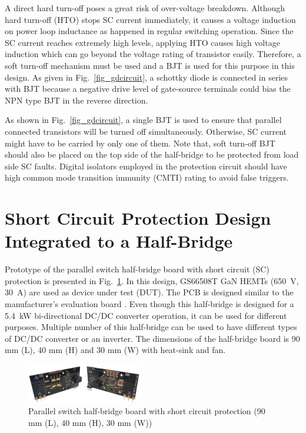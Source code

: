 \documentclass[journal]{IEEEtran}
\begin{document}
A direct hard turn-off poses a great risk of over-voltage breakdown. Although hard turn-off (HTO) stops SC current immediately, it causes a voltage induction on power loop inductance as happened in regular switching operation. Since the SC current reaches extremely high levels, applying HTO causes high voltage induction which can go beyond the voltage rating of transistor easily. Therefore, a soft turn-off mechanism must be used and a BJT is used for this purpose in this design. As given in Fig.~\ref{fig_gdcircuit}, a schottky diode is connected in series with BJT because a negative drive level of gate-source terminals could bias the NPN type BJT in the reverse direction.

As shown in Fig.~\ref{fig_gdcircuit}, a single BJT is used to ensure that parallel connected transistors will be turned off simultaneously. Otherwise, SC current might have to be carried by only one of them. Note that, soft turn-off BJT should also be placed on the top side of the half-bridge to be protected from load side SC faults. Digital isolators employed in the protection circuit should have high common mode transition immunity (CMTI) rating to avoid false triggers.

\section{Short Circuit Protection Design Integrated to a Half-Bridge}

Prototype of the parallel switch half-bridge board with short circuit (SC) protection is presented in Fig.~\ref{fig_pcb}. In this design, GS66508T GaN HEMTs (650~V, 30~A) are used as device under test (DUT). The PCB is designed similar to the manufacturer's evaluation board \cite{GaNSystems2018}. Even though this half-bridge is designed for a 5.4~kW bi-directional DC/DC converter operation, it can be used for different purposes. Multiple number of this half-bridge can be used to have  different types of DC/DC converter or an inverter. The dimensions of the half-bridge board is 90 mm (L), 40 mm (H) and 30 mm (W) with heat-sink and fan.

\begin{figure}[!t]
\centering
\includegraphics[width=0.45\textwidth]{Figures/Fig4-BoardView3D.pdf}
\caption{Parallel switch half-bridge board with short circuit protection (90 mm (L), 40 mm (H), 30 mm (W))}
\label{fig_pcb}
\end{figure}
\end{document}
